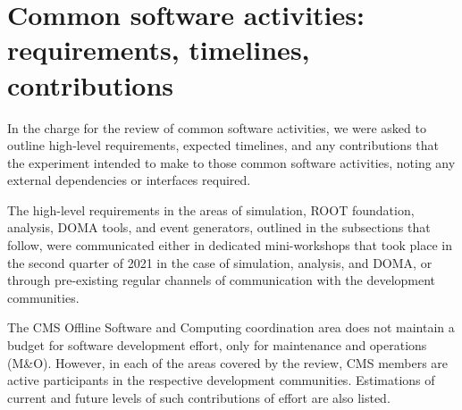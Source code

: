 \section{Common software activities: requirements, timelines, contributions}
In the charge for the review of common software activities, we were asked to outline high-level requirements, expected timelines, and any contributions that the experiment intended to make to those common software activities, noting any external dependencies or interfaces required. %

The high-level requirements in the areas of simulation, ROOT foundation, analysis, DOMA tools, and event generators, outlined in the subsections that follow, were communicated either in dedicated mini-workshops that took place in the second quarter of 2021 in the case of simulation, analysis, and DOMA, or through pre-existing regular channels of communication with the development communities.

The CMS Offline Software and Computing coordination area does not maintain a budget for software development effort, only for maintenance and operations (M\&O). However, in each of the areas covered by the review, CMS members are active participants in the respective development communities. Estimations of current and future levels of such contributions of effort are also listed.


